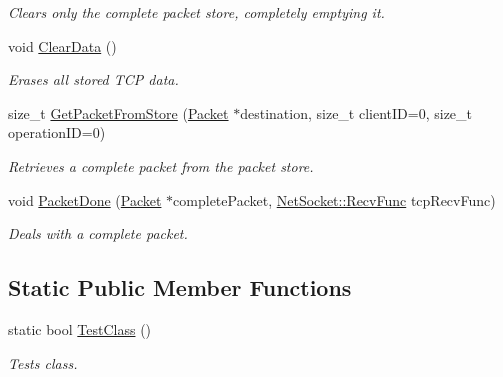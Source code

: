 \begin{DoxyCompactItemize}
\begin{DoxyCompactList}\small\item\em Clears only the complete packet store, completely emptying it. \item\end{DoxyCompactList}\item 
void \hyperlink{class_net_mode_tcp_a4085cc53d5c59a3185c9596293b86766}{ClearData} ()
\begin{DoxyCompactList}\small\item\em Erases all stored TCP data. \item\end{DoxyCompactList}\item 
size\_\-t \hyperlink{class_net_mode_tcp_aa9ac5206e18d0c824daffccccfbc9f61}{GetPacketFromStore} (\hyperlink{class_packet}{Packet} $\ast$destination, size\_\-t clientID=0, size\_\-t operationID=0)
\begin{DoxyCompactList}\small\item\em Retrieves a complete packet from the packet store. \item\end{DoxyCompactList}\item 
void \hyperlink{class_net_mode_tcp_ae031c101bb0bc3c974879ab41e034ebd}{PacketDone} (\hyperlink{class_packet}{Packet} $\ast$completePacket, \hyperlink{class_net_socket_a52b5f4de8d0a47fd8620f542b21c076c}{NetSocket::RecvFunc} tcpRecvFunc)
\begin{DoxyCompactList}\small\item\em Deals with a complete packet. \item\end{DoxyCompactList}\end{DoxyCompactItemize}
\subsection*{Static Public Member Functions}
\begin{DoxyCompactItemize}
\item 
static bool \hyperlink{class_net_mode_tcp_ad3f11796c2db6af88ff4fc3f4e820323}{TestClass} ()
\begin{DoxyCompactList}\small\item\em Tests class. \item\end{DoxyCompactList}\end{DoxyCompactItemize}
